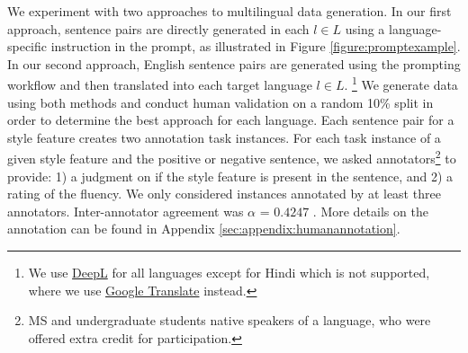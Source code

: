 We experiment with two approaches to multilingual data generation. In our first approach, sentence pairs are directly generated in each $l \in L$ using a language-specific instruction in the prompt, as illustrated in Figure \ref{figure:promptexample}. %
In our second approach, English sentence pairs are generated using the prompting workflow and then translated into each target language $l \in L$.%
\footnote{We use \href{https://www.deepl.com}{DeepL} for all languages except for Hindi which is not supported, where we use \href{https://translate.google.com}{Google Translate} instead.} %
We generate data using both methods and conduct human validation on a random 10\% split in order to determine the best approach for each language. 
\promptexample
Each sentence pair for a style feature creates two annotation task instances. For each task instance of a given style feature and the positive or negative sentence, we asked annotators\footnote{MS and undergraduate students native speakers of a language, who were offered extra credit for participation.} to provide: 1) a judgment on if the style feature is present in the sentence, and 2) a rating of the fluency.
We only considered instances annotated by at least three annotators. Inter-annotator agreement was $\alpha$ = $0.4247$ \citep{krippendorffalpha}. More details on the annotation can be found in Appendix \ref{sec:appendix:humanannotation}.

